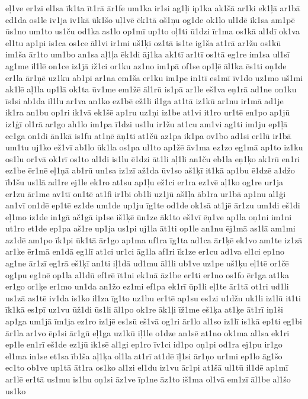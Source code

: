 {eļ1ve
er1zi
el1sa
īk1ta
īt1rā
ār1fe
um1ka
ir1si
ag1ļi
ip1ka
ak1šā
ar1ki
ek1ļā
ar1bā
ed1da
os1le
iv1ja
iv1kā
ūk1šo
uļ1vē
ēk1tā
oš1ņu
og1de
ok1ļo
ul1dē
ik1sa
am1pē
ūs1no
um1to
us1ču
od1ka
as1lo
op1mī
up1to
oļ1ti
ū1dzi
īr1ma
os1kā
al1dī
ok1va
el1tu
ap1pi
is1ca
os1ce
āl1vi
ir1mi
uš1ķi
oz1tā
is1te
ig1ša
at1rā
ar1žu
os1kū
im1ša
ār1to
um1bo
an1sa
aļ1ļa
ēk1di
āj1ka
ak1tī
ar1tī
os1tā
eg1re
im1sa
ul1sī
ag1me
il1lē
on1ce
iz1jā
iž1ci
or1ku
az1no
im1pā
of1se
op1ļē
āl1ka
ēs1ti
oņ1de
er1la
ār1ņē
uz1ku
ab1pi
ar1na
em1ša
er1ku
im1pe
in1tī
es1mī
īv1do
uz1mo
uš1mi
ak1lē
aļ1la
up1lā
ok1ta
ūv1me
em1žē
āl1rū
is1pā
ar1le
eš1va
eņ1rā
ad1ne
on1ku
īs1si
ab1da
il1lu
ar1va
an1ko
ez1bē
ež1li
il1ga
at1tā
iz1kū
ar1nu
ir1mā
ad1je
ik1ra
an1bu
op1ri
ik1vā
ek1šē
ap1ru
uz1ņi
iz1be
at1vi
it1ro
ur1tē
en1po
ap1jū
iz1ģī
ol1rā
ar1go
ah1lo
im1pa
ī1dzi
us1lu
ir1žu
at1cu
am1vi
ag1ti
im1ju
ep1ļā
ec1ga
on1di
ān1kā
is1fu
at1ņē
āņ1ti
at1čū
az1pa
ik1pa
ov1bo
ad1si
er1lū
ir1bā
um1tu
uj1ko
ež1vī
ab1lo
ūk1la
os1pa
ul1to
ap1žē
āv1ma
ez1zo
eg1mā
ap1to
iz1ku
os1lu
or1vā
ok1rī
os1to
al1di
is1lu
ē1dzi
āt1li
aļ1li
an1ču
eb1la
eņ1ķo
ak1rū
en1ri
ez1be
ēr1nē
eļ1ņā
ab1rū
un1sa
iz1zī
až1da
ūv1so
aš1ķī
it1kā
ap1bu
ē1dzē
a1džo
īb1šu
us1lā
ad1re
ej1le
ek1ro
at1su
ap1ļu
ež1ci
er1ra
ez1vē
aļ1ko
og1re
ur1ja
er1zu
ār1me
av1tī
on1tē
at1fi
ir1bi
ob1li
uz1jū
aš1ļa
āb1ra
ur1bā
ap1nu
al1ģi
an1vī
on1dē
ep1tē
ez1de
um1de
up1ju
īg1te
od1de
ok1sā
at1jē
ār1zu
um1di
eš1di
eļ1mo
iz1de
in1gā
ač1gā
ip1se
iš1ķē
ūn1ze
āk1to
eš1vī
ēņ1ve
ap1la
oņ1ni
im1ni
ut1ro
et1de
ep1pa
aš1re
up1ja
us1pi
uj1la
āt1ti
op1le
an1nu
ēj1mā
as1lā
am1mi
az1dē
am1po
īk1pi
ūk1tā
ār1go
ap1ma
uf1ra
īg1ta
ad1ca
ār1ķē
ek1vo
am1te
iz1zā
ar1ke
ēr1mā
en1dā
eg1lī
at1ci
ur1ci
āg1la
af1ri
īk1ze
er1cu
ad1va
el1ci
ep1no
ag1ne
ār1zī
eg1rā
eš1ķī
an1ti
iļ1dā
ud1mu
āl1li
ub1ve
uz1pe
uš1ķu
eļ1tē
or1čē
og1pu
eg1nē
op1la
al1dū
ef1rē
īt1ni
ek1nā
āz1be
er1ti
er1no
os1fo
ēr1ga
at1ka
er1go
or1ķe
er1mo
un1da
an1žo
ez1mi
ef1pa
ek1rī
ūp1li
eļ1te
ār1tā
ot1ri
ud1li
us1zā
as1tē
iv1da
is1ko
il1za
īg1to
uz1bu
er1tē
ap1su
es1zi
u1džu
uk1li
iz1lū
it1ti
īk1kā
es1pī
uz1vu
ūž1di
ūs1li
āl1po
ok1re
āk1ļi
īž1me
eš1ķa
at1ķe
āt1rī
iņ1ši
ap1ga
um1jā
īm1ja
ez1ro
iz1jē
es1sū
eš1vā
og1ri
ār1lo
al1so
iz1lī
is1kā
ep1ti
eg1bi
ār1la
ar1vo
ēp1si
ār1gū
eļ1ga
uz1kū
iļ1le
o1dze
an1sē
at1no
ok1ma
al1sa
ek1ri
ep1le
en1rī
eš1de
ez1jū
ik1sē
al1gi
ep1ro
īv1ci
id1po
oņ1pi
od1ra
ej1pu
ir1go
el1ma
in1se
et1sa
īb1ša
aļ1ķa
ol1la
at1rī
at1dē
īļ1si
ār1ņo
ur1mi
ep1lo
āg1šo
ec1to
ob1ve
up1tā
āt1ra
os1ko
al1zi
el1du
iz1vu
ār1pi
at1šā
ul1tū
il1dē
ap1mī
ar1lē
er1tā
us1mu
is1hu
oņ1si
āz1ve
īp1ne
āz1to
iš1ma
ol1vā
em1zī
āl1be
al1šo
us1ko
}
